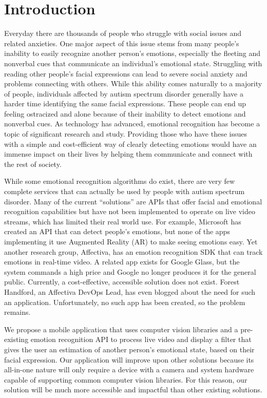 \chapter{Introduction}
Everyday there are thousands of people who struggle with social issues and related anxieties. One major aspect of this issue stems from many people's inability to easily recognize another person's emotions, especially the fleeting and nonverbal cues that communicate an individual's emotional state. Struggling with reading other people's facial expressions can lead to severe social anxiety and problems connecting with others. While this ability comes naturally to a majority of people, individuals affected by autism spectrum disorder generally have a harder time identifying the same facial expressions. These people can end up feeling ostracized and alone because of their inability to detect emotions and nonverbal cues. As technology has advanced, emotional recognition has become a topic of significant research and study. Providing those who have these issues with a simple and cost-efficient way of clearly detecting emotions would have an immense impact on their lives by helping them communicate and connect with the rest of society.
\par
	While some emotional recognition algorithms do exist, there are very few complete services that can actually be used by people with autism spectrum disorder. Many of the current “solutions” are APIs that offer facial and emotional recognition capabilities but have not been implemented to operate on live video streams, which has limited their real world use. For example, Microsoft has created an API that can detect people’s emotions, but none of the apps implementing it use Augmented Reality (AR) to make seeing emotions easy. Yet another research group, Affectiva, has an emotion recognition SDK that can track emotions in real-time video. A related app exists for Google Glass, but the system commands a high price and Google no longer produces it for the general public. Currently, a cost-effective, accessible solution does not exist. Forest Handford, an Affectiva DevOps Lead, has even blogged about the need for such an application. Unfortunately, no such app has been created, so the problem remains.
\par
	We propose a mobile application that uses computer vision libraries and a pre-existing emotion recognition API to process live video and display a filter that gives the user an estimation of another person's emotional state, based on their facial expression. Our application will improve upon other solutions because its all-in-one nature will only require a device with a camera and system hardware capable of supporting common computer vision libraries. For this reason, our solution will be much more accessible and impactful than other existing solutions.